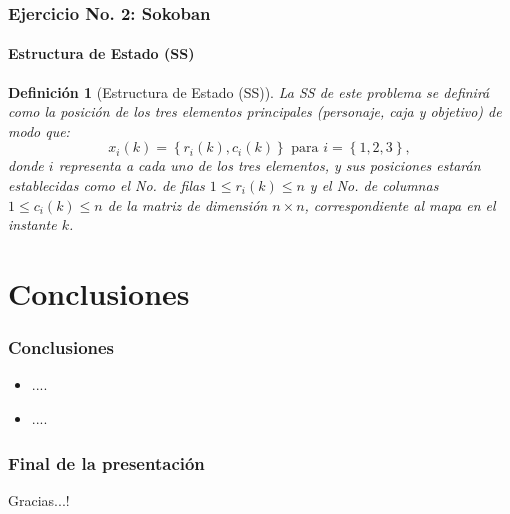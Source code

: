 \documentclass[aspectratio=169]{beamer}
\newtheorem{definicion}{Definici\'on}
\begin{document}
\begin{frame}
\frametitle{Ejercicio No. 2: Sokoban}
\framesubtitle{Estructura de Estado (SS)}
\begin{definicion}[Estructura de Estado (SS)]
La SS de este problema se definirá como la posición de los tres elementos principales (personaje, caja y objetivo)
de modo que: 
\begin{equation*}
x_i(k) = \left\{r_i(k),c_i(k)\right\} \text{ para } i = \left\{1,2,3\right\},
\end{equation*}
donde $i$ representa a cada uno de los tres elementos, y sus posiciones estarán establecidas como el No. de filas $1\!\leq\!r_i(k)\!\leq\!n$ y el No. de
columnas $1\!\leq\!c_i(k)\!\leq\!n$ de la matriz de dimensión $n\!\times\!n$, correspondiente al mapa en el instante $k$.
\end{definicion}
\end{frame}
\section{Conclusiones}
\begin{frame}
\frametitle{Conclusiones}
\begin{itemize}
\item ....\vspace{.25cm}
\item ....
\end{itemize}
\end{frame}
\begin{frame}
\frametitle{Final de la presentación}

\Huge Gracias...!
\end{frame}
\end{document}
